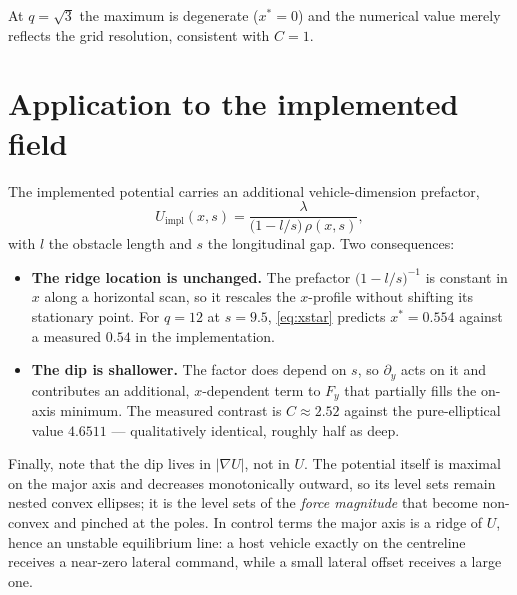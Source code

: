 \documentclass[11pt]{article}
\begin{document}
\noindent
At $q=\sqrt3$ the maximum is degenerate ($x^{*}=0$) and the numerical value
merely reflects the grid resolution, consistent with $C=1$.

\section{Application to the implemented field}

The implemented potential carries an additional vehicle-dimension prefactor,
\begin{equation}
  U_{\text{impl}}(x,s)=\frac{\lambda}{\bigl(1-l/s\bigr)\,\rho(x,s)} ,
  \label{eq:Uimpl}
\end{equation}
with $l$ the obstacle length and $s$ the longitudinal gap. Two consequences:

\begin{itemize}
  \item \textbf{The ridge location is unchanged.} The prefactor
        $\bigl(1-l/s\bigr)^{-1}$ is constant in $x$ along a horizontal scan,
        so it rescales the $x$-profile without shifting its stationary point.
        For $q=12$ at $s=9.5$, \eqref{eq:xstar} predicts $x^{*}=0.554$ against
        a measured $0.54$ in the implementation.
  \item \textbf{The dip is shallower.} The factor does depend on $s$, so
        $\partial_{y}$ acts on it and contributes an additional,
        $x$-dependent term to $F_{y}$ that partially fills the on-axis
        minimum. The measured contrast is $C\approx2.52$ against the
        pure-elliptical value $4.6511$ --- qualitatively identical, roughly
        half as deep.
\end{itemize}

Finally, note that the dip lives in $|\nabla U|$, not in $U$. The potential
itself is maximal on the major axis and decreases monotonically outward, so
its level sets remain nested convex ellipses; it is the level sets of the
\emph{force magnitude} that become non-convex and pinched at the poles. In
control terms the major axis is a ridge of $U$, hence an unstable
equilibrium line: a host vehicle exactly on the centreline receives a
near-zero lateral command, while a small lateral offset receives a large one.
\end{document}
